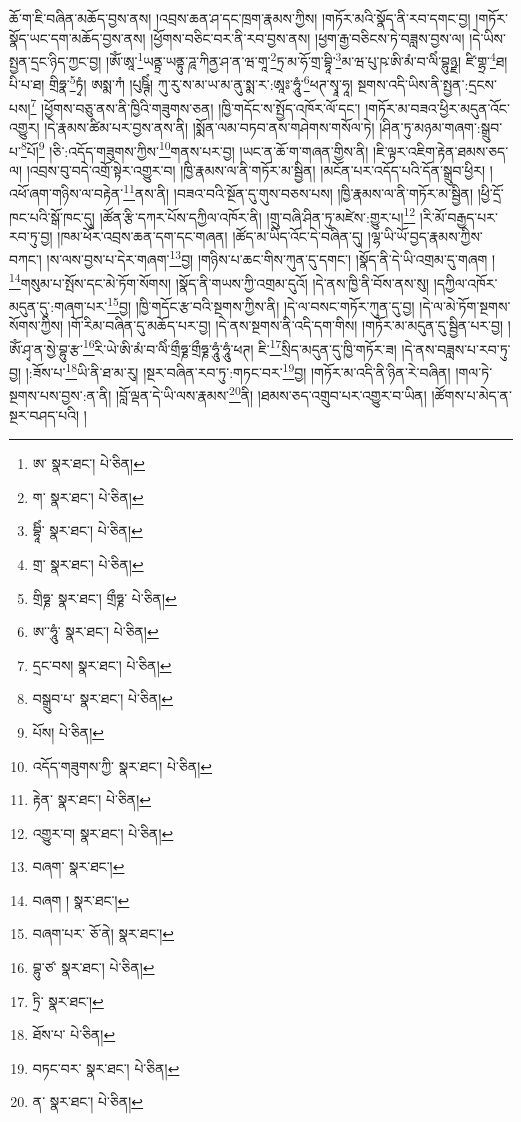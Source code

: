 ཆོ་ག་ཇི་བཞིན་མཆོད་བྱས་ནས། །འབྲས་ཆན་ཤ་དང་ཁྲག་རྣམས་ཀྱིས། །གཏོར་མའི་སྣོད་ནི་རབ་དགང་བྱ། །གཏོར་སྣོད་ཡང་དག་མཆོད་བྱས་ནས། །ཕྱོགས་བཅིང་བར་ནི་རབ་བྱས་ནས། །ཕྱག་རྒྱ་བཅིངས་ཏེ་བཟླས་བྱས་ལ། །དེ་ཡིས་སྤྱན་དྲང་ཉིད་ཀྱང་བྱ། །ཨོཾ་ཨཱ་\footnote{ཨ་  སྣར་ཐང་།  པེ་ཅིན། }ཡནྟྲ་ཡནྟུ་ཌཱ་ཀིནྱ་ཤ་ན་ཝ་གཱ་\footnote{ག་  སྣར་ཐང་།  པེ་ཅིན། }ཏྲ་མ་ཧོ་གྲ་བྷཱི་\footnote{བྷཱིཾ་  སྣར་ཐང་།  པེ་ཅིན། }མ་ཝ་པུ་ཥ་ཨི་མཾ་བ་ལིཾ་བྷུཉྫ། ཛི་གྷྲ་\footnote{གྲ་  སྣར་ཐང་།  པེ་ཅིན། }ཐ། པི་པ་ཐ། གྲིཧྣ་\footnote{གྲིཧྞ་  སྣར་ཐང་། གྲྀཧྞ་  པེ་ཅིན། }ཏྭཾ། ཨསྨ་ཀཾ །པུཥྚིཾ། ཀུ་རུ་ས་མ་ཡ་མ་ནུ་སྨ་ར་:ཨཱཿ་ཧཱུཾ་\footnote{ཨ་་ཧཱུཾ་  སྣར་ཐང་།  པེ་ཅིན། }ཕཊ་སྭཱ་ཧཱ། སྔགས་འདི་ཡིས་ནི་སྤྱན་:དྲངས་པས།\footnote{དྲང་བས།  སྣར་ཐང་།  པེ་ཅིན། } །ཕྱོགས་བཅུ་ནས་ནི་ཁྱིའི་གཟུགས་ཅན། །ཁྱི་གདོང་ས་སྤྱོད་འཁོར་ལོ་དང་། །གཏོར་མ་བཟའ་ཕྱིར་མདུན་འོང་འགྱུར། །དེ་རྣམས་ཚིམ་པར་བྱས་ནས་ནི། །སྨོན་ལམ་བཏབ་ནས་གཤེགས་གསོལ་ཏེ། །ཤིན་ཏུ་མཉམ་གཞག་:སྒྲུབ་པ་\footnote{བསྒྲུབ་པ་  སྣར་ཐང་།  པེ་ཅིན། }པོ།\footnote{པོས།  པེ་ཅིན། } །ཅི་:འདོད་གཟུགས་ཀྱིས་\footnote{འདོད་གཟུགས་ཀྱི་  སྣར་ཐང་།  པེ་ཅིན། }གནས་པར་བྱ། །ཡང་ན་ཆོ་ག་གཞན་གྱིས་ནི། །ཇི་ལྟར་འཇིག་རྟེན་ཐམས་ཅད་ལ། །འབྲས་བུ་བདེ་འགྲོ་སྟེར་འགྱུར་བ། །ཁྱི་རྣམས་ལ་ནི་གཏོར་མ་སྦྱིན། །མངོན་པར་འདོད་པའི་དོན་སྒྲུབ་ཕྱིར། །འཕོ་ཞག་གཉིས་ལ་བརྟེན་\footnote{རྟེན་  སྣར་ཐང་།  པེ་ཅིན། }ནས་ནི། །བཟའ་བའི་སྔོན་དུ་གུས་བཅས་པས། །ཁྱི་རྣམས་ལ་ནི་གཏོར་མ་སྦྱིན། །ཕྱི་དྲོ་ཁང་པའི་སྒོ་ཁང་དུ། །ཚོན་རྩི་དཀར་པོས་དཀྱིལ་འཁོར་ནི། །གྲུ་བཞི་ཤིན་ཏུ་མཛེས་:གྱུར་པ།\footnote{འགྱུར་བ།  སྣར་ཐང་།  པེ་ཅིན། } །རི་མོ་བརྒྱད་པར་རབ་ཏུ་བྱ། །ཁམ་ཕོར་འབྲས་ཆན་དག་དང་གཞན། །ཚོད་མ་ཡིད་འོང་དེ་བཞིན་དུ། །ལྷ་ཡི་ཡོ་བྱད་རྣམས་ཀྱིས་བཀང་། །ས་ལས་བྱས་པ་དེར་གཞག་\footnote{བཞག་  སྣར་ཐང་། }བྱ། །གཉིས་པ་ཆང་གིས་ཀུན་དུ་དགང་། །སྣོད་ནི་དེ་ཡི་འགྲམ་དུ་གཞག །\footnote{བཞག །  སྣར་ཐང་། }གསུམ་པ་སྤོས་དང་མེ་ཏོག་སོགས། །སྣོད་ནི་གཡས་ཀྱི་འགྲམ་དུའོ། །དེ་ནས་ཁྱི་ནི་བོས་ནས་སུ། །དཀྱིལ་འཁོར་མདུན་དུ་:གཞག་པར་\footnote{བཞག་པར་  ཅོ་ནེ།  སྣར་ཐང་། }བྱ། །ཁྱི་གདོང་རྩ་བའི་སྔགས་ཀྱིས་ནི། །དེ་ལ་བསང་གཏོར་ཀུན་དུ་བྱ། །དེ་ལ་མེ་ཏོག་སྔགས་སོགས་ཀྱིས། །གོ་རིམ་བཞིན་དུ་མཆོད་པར་བྱ། །དེ་ནས་སྔགས་ནི་འདི་དག་གིས། །གཏོར་མ་མདུན་དུ་སྦྱིན་པར་བྱ། །ཨོཾ་ཤྭ་ན་སྱེ་བྷུ་རྩ་\footnote{བྷུ་ཙ་  སྣར་ཐང་།  པེ་ཅིན། }རི་ཡེ་ཨི་མཾ་བ་ལིཾ་གྲྀཧྞ་གྲྀཧྞ་ཧཱུཾ་ཧཱུཾ་ཕཊ། ཇི་\footnote{ཏྲི་  སྣར་ཐང་། }སྲིད་མདུན་དུ་ཁྱི་གཏོར་ཟ། །དེ་ནས་བཟླས་པ་རབ་ཏུ་བྱ། །:ཟོས་པ་\footnote{ཐོས་པ་  པེ་ཅིན། }ཡི་ནི་ཐ་མ་རུ། །སྔར་བཞིན་རབ་ཏུ་:གཏང་བར་\footnote{བཏང་བར་  སྣར་ཐང་།  པེ་ཅིན། }བྱ། །གཏོར་མ་འདི་ནི་ཉིན་རེ་བཞིན། །གལ་ཏེ་སྔགས་པས་བྱས་:ན་ནི། །བློ་ལྡན་དེ་ཡི་ལས་རྣམས་\footnote{ན་  སྣར་ཐང་།  པེ་ཅིན། }ནི། །ཐམས་ཅད་འགྲུབ་པར་འགྱུར་བ་ཡིན། །ཚོགས་པ་མེད་ན་སྔར་བཤད་པའི། །

